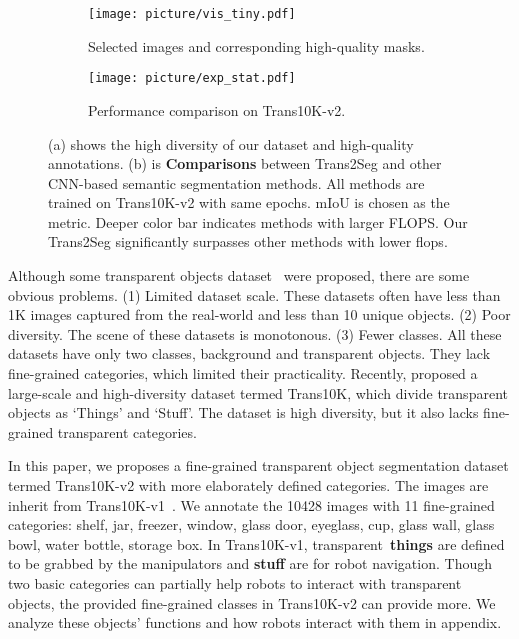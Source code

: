 \documentclass{article}
\begin{document}
\begin{figure}[t]
  \centering
    \begin{subfigure}{0.47\textwidth}
      \centering   
      \texttt{[image: picture/vis\_tiny.pdf]}
        \caption{Selected images and corresponding high-quality masks.}
        \label{fig:sub1}
    \end{subfigure}   \begin{subfigure}{0.47\textwidth}
      \centering   
      \texttt{[image: picture/exp\_stat.pdf]}
        \caption{Performance comparison on Trans10K-v2.}
        \label{fig:exp_stat}
    \end{subfigure}
    \vspace{-5pt}
\caption{\label{fig:total1}
(a) shows the high diversity of our dataset and high-quality annotations.  
(b) is \textbf{Comparisons} between Trans2Seg and other CNN-based semantic segmentation methods. All methods are trained on Trans10K-v2 with same epochs. mIoU is chosen as the metric. Deeper color bar indicates methods with larger FLOPS. Our Trans2Seg significantly surpasses other methods with lower flops.
}
\vspace{-10pt}
\end{figure}

Although some transparent objects dataset~\cite{transcut,tomnet,GDNet} were proposed, there are some obvious problems.
(1) Limited dataset scale. These datasets often have less than 1K images captured from the real-world and less than 10 unique objects.
(2) Poor diversity. The scene of these datasets is monotonous.
(3) Fewer classes. All these datasets have only two classes, background and transparent objects. They lack fine-grained categories, which limited their practicality.
Recently, \cite{translab} proposed a large-scale and high-diversity dataset termed Trans10K, which divide transparent objects as `Things' and `Stuff'. The dataset is high diversity, but it also lacks fine-grained transparent categories.

In this paper, we proposes a fine-grained transparent object segmentation dataset termed Trans10K-v2 with more elaborately defined categories. The images are inherit from Trans10K-v1~\cite{translab}.
We annotate the 10428 images with 11 fine-grained categories: shelf, jar, freezer, window, glass door, eyeglass, cup, glass wall, glass bowl, water bottle, storage box. 
In Trans10K-v1, transparent~\textbf{things} are defined to be grabbed by the manipulators and \textbf{stuff} are for robot navigation. Though two basic categories can partially help robots to interact with transparent objects, the provided fine-grained classes in Trans10K-v2 can provide more. We analyze these objects' functions and how robots interact with them in appendix.
\end{document}
